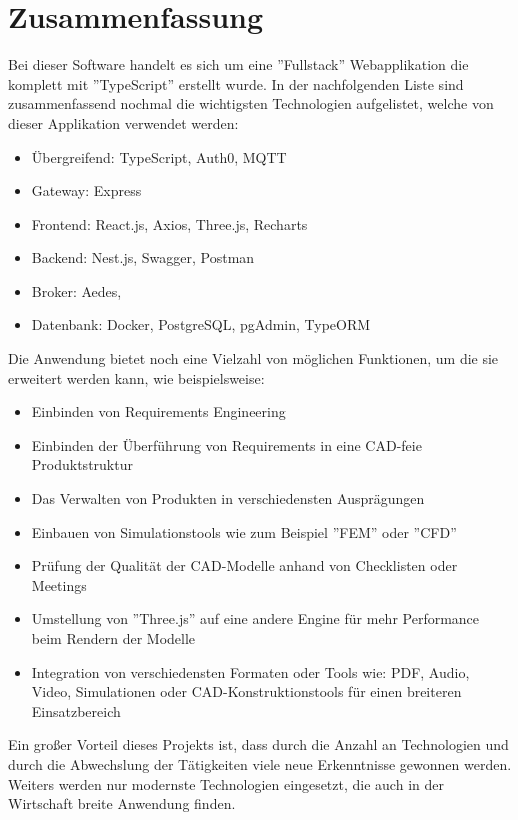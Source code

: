 \chapter{Zusammenfassung}
Bei dieser Software handelt es sich um eine ''Fullstack'' Webapplikation die komplett mit ''TypeScript'' erstellt wurde. In der nachfolgenden Liste sind zusammenfassend nochmal die wichtigsten Technologien aufgelistet, welche von dieser Applikation verwendet werden:

\begin{itemize}
    \item Übergreifend: TypeScript, Auth0, MQTT
    \item Gateway: Express
	\item Frontend: React.js, Axios, Three.js, Recharts
	\item Backend: Nest.js, Swagger, Postman
	\item Broker: Aedes,
	\item Datenbank: Docker, PostgreSQL, pgAdmin, TypeORM
\end{itemize}

Die Anwendung bietet noch eine Vielzahl von möglichen Funktionen, um die sie erweitert werden kann, wie beispielsweise:

\begin{itemize}
    \item Einbinden von Requirements Engineering
    \item Einbinden der Überführung von Requirements in eine CAD-feie Produktstruktur
    \item Das Verwalten von Produkten in verschiedensten Ausprägungen
    \item Einbauen von Simulationstools wie zum Beispiel ''FEM'' oder ''CFD''
    \item Prüfung der Qualität der CAD-Modelle anhand von Checklisten oder Meetings
    \item Umstellung von ''Three.js'' auf eine andere Engine für mehr Performance beim Rendern der Modelle
    \item Integration von verschiedensten Formaten oder Tools wie: PDF, Audio, Video, Simulationen oder CAD-Konstruktionstools für einen breiteren Einsatzbereich
\end{itemize}

Ein großer Vorteil dieses Projekts ist, dass durch die Anzahl an Technologien und durch die Abwechslung der Tätigkeiten viele neue Erkenntnisse gewonnen werden. Weiters werden nur modernste Technologien eingesetzt, die auch in der Wirtschaft breite Anwendung finden.